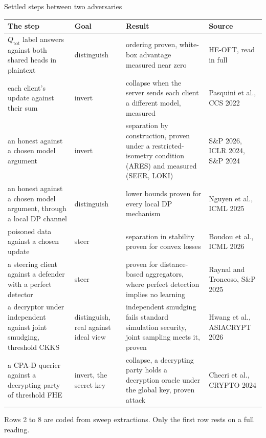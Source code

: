 \documentclass[aspectratio=169,10pt]{beamer}
\newcommand{\Qtot}{Q_{\mathrm{tot}}}
\begin{document}
\begin{frame}{Settled steps between two adversaries}
  \begin{center}
  \scriptsize
  \renewcommand{\arraystretch}{1.0}
  \begin{tabular}{@{}p{3.3cm}p{1.5cm}p{5.1cm}p{3.1cm}@{}}
    \toprule
    The step & Goal & Result & Source\\
    \midrule
    $\Qtot$ label answers against both shared heads in plaintext & distinguish & ordering proven, white-box advantage measured near zero & HE-OFT, read in full\\
    each client's update against their sum & invert & collapse when the server sends each client a different model, measured & Pasquini et al., CCS 2022\\
    an honest against a chosen model argument & invert & separation by construction, proven under a restricted-isometry condition (ARES) and measured (SEER, LOKI) & S\&P 2026, ICLR 2024, S\&P 2024\\
    an honest against a chosen model argument, through a local DP channel & distinguish & lower bounds proven for every local DP mechanism & Nguyen et al., ICML 2025\\
    poisoned data against a chosen update & steer & separation in stability proven for convex losses & Boudou et al., ICML 2026\\
    a steering client against a defender with a perfect detector & steer & proven for distance-based aggregators, where perfect detection implies no learning & Raynal and Troncoso, S\&P 2025\\
    a decryptor under independent against joint smudging, threshold CKKS & distinguish, real against ideal view & independent smudging fails standard simulation security, joint sampling meets it, proven & Hwang et al., ASIACRYPT 2026\\
    a CPA-D querier against a decrypting party of threshold FHE & invert, the secret key & collapse, a decrypting party holds a decryption oracle under the global key, proven attack & Checri et al., CRYPTO 2024\\
    \bottomrule
  \end{tabular}
  \end{center}
  \vspace{0.1em}
  \scriptsize Rows 2 to 8 are coded from sweep extractions. Only the first row rests on a full reading.
\end{frame}
\end{document}
